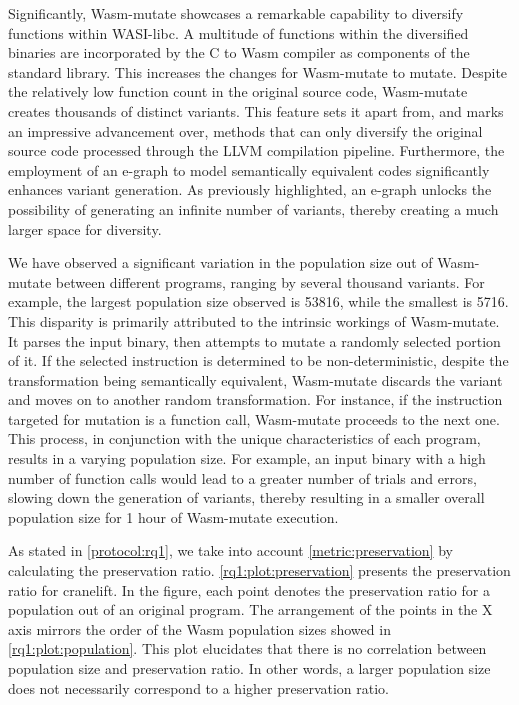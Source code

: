 \documentclass[sigplan,screen]{acmart}
\newcommand{\tool}{Wasm-mutate\xspace}
\newcommand{\wasm}{Wasm\xspace}
\begin{document}
Significantly, \tool showcases a remarkable capability to diversify functions within WASI-libc. 
A multitude of functions within the diversified binaries are incorporated by the C to \wasm compiler as components of the standard library. 
This increases the changes for \tool to mutate.
Despite the relatively low function count in the original source code,  \tool creates thousands of distinct variants. 
This feature sets it apart from, and marks an impressive advancement over, methods that can only diversify the original source code processed through the LLVM compilation pipeline. 
Furthermore, the employment of an e-graph to model semantically equivalent codes significantly enhances variant generation. 
As previously highlighted, an e-graph unlocks the possibility of generating an infinite number of variants, thereby creating a much larger space for diversity.


We have observed a significant variation in the population size out of \tool between different programs, ranging by several thousand variants. 
For example, the largest population size observed is 53816, while the smallest is 5716.
This disparity is primarily attributed to the intrinsic workings of \tool. 
It parses the input binary, then attempts to mutate a randomly selected portion of it. 
If the selected instruction is determined to be non-deterministic, despite the transformation being semantically equivalent, \tool discards the variant and moves on to another random transformation.
For instance, if the instruction targeted for mutation is a function call, \tool proceeds to the next one.
This process, in conjunction with the unique characteristics of each program, results in a varying population size. 
For example, an input binary with a high number of function calls would lead to a greater number of trials and errors, slowing down the generation of variants, thereby resulting in a smaller overall population size for 1 hour of \tool execution.

As stated in \autoref{protocol:rq1}, we take into account \autoref{metric:preservation} by calculating the preservation ratio. 
\autoref{rq1:plot:preservation} presents the preservation ratio for cranelift. 
In the figure, each point denotes the preservation ratio for a population out of an original program.
The arrangement of the points in the X axis mirrors the order of the \wasm population sizes showed in \autoref{rq1:plot:population}. 
This plot elucidates that there is no correlation between population size and preservation ratio. 
In other words, a larger population size does not necessarily correspond to a higher preservation ratio.
\end{document}
